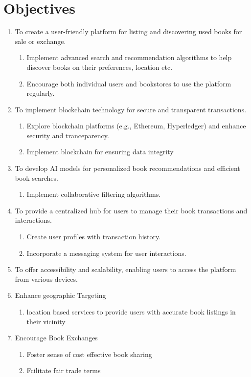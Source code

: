 \documentclass{article}
\begin{document}
\section{Objectives}
\begin{enumerate}
    \item To create a user-friendly platform for listing and discovering used books for sale or exchange.
      \begin{enumerate}
          \item Implement advanced search and recommendation algorithms to help discover books on their preferences, location etc.
          \item Encourage both individual users and bookstores to use the platform regularly.
      \end{enumerate}
    \item To implement blockchain technology for secure and transparent transactions.
      \begin{enumerate}
          \item Explore blockchain platforms (e.g., Ethereum, Hyperledger) and enhance security and tranceparency.
          \item Implement blockchain for ensuring data integrity
      \end{enumerate}
    \item To develop AI models for personalized book recommendations and efficient book searches.
      \begin{enumerate}
          \item Implement collaborative filtering algorithms.
      \end{enumerate}
    \item To provide a centralized hub for users to manage their book transactions and interactions.
      \begin{enumerate}
          \item Create user profiles with transaction history.
          \item Incorporate a messaging system for user interactions.
      \end{enumerate}
    \item To offer accessibility and scalability, enabling users to access the platform from various devices.
    \item Enhance geographic Targeting
      \begin{enumerate}
       \item location based services to provide users with accurate book listings in their vicinity
      \end{enumerate}
       \item Encourage Book Exchanges
      \begin{enumerate}
          \item Foster sense of cost effective book sharing
         \item Fcilitate fair trade terms
      \end{enumerate}
  \end{enumerate}
\end{document}
